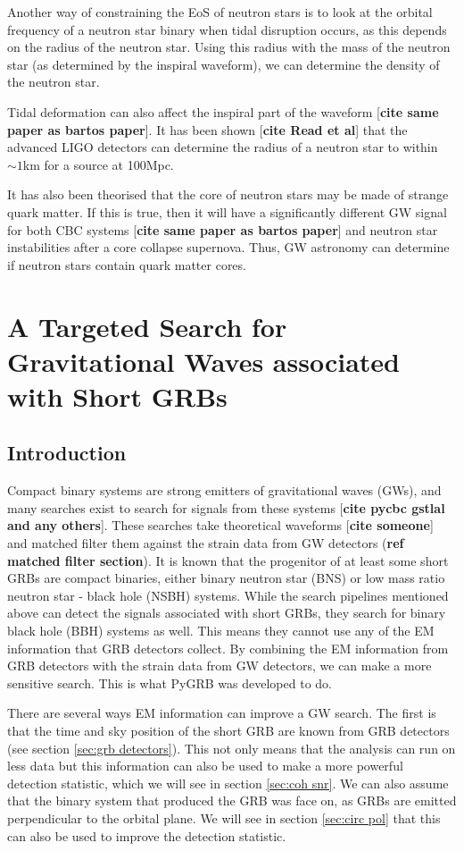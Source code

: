 \documentclass[11pt]{cuthesis}
\begin{document}
Another way of constraining the EoS of neutron stars is to look at the orbital frequency of a neutron star binary when tidal disruption occurs, as this depends on the radius of the neutron star. Using this radius with the mass of the neutron star (as determined by the inspiral waveform), we can determine the density of the neutron star. 

Tidal deformation can also affect the inspiral part of the waveform [\textbf{cite same paper as bartos paper}]. It has been shown [\textbf{cite Read et al}] that the advanced LIGO detectors can determine the radius of a neutron star to within $\sim 1$km for a source at 100Mpc. 

It has also been theorised that the core of neutron stars may be made of strange quark matter. If this is true, then it will have a significantly different GW signal for both CBC systems [\textbf{cite same paper as bartos paper}] and neutron star instabilities after a core collapse supernova. Thus, GW astronomy can determine if neutron stars contain quark matter cores. 


\chapter{A Targeted Search for Gravitational Waves associated with Short GRBs} \label{chap: CBC}
\section{Introduction}\label{CBCintro}
Compact binary systems are strong emitters of gravitational waves (GWs), and many searches exist to search for signals from these systems [\textbf{cite pycbc gstlal and any others}]. These searches take theoretical waveforms [\textbf{cite someone}] and matched filter them against the strain data from GW detectors (\textbf{ref matched filter section}). It is known that the progenitor of at least some short GRBs are compact binaries, either binary neutron star (BNS) or low mass ratio neutron star - black hole (NSBH) systems. While the search pipelines mentioned above can detect the signals associated with short GRBs, they search for binary black hole (BBH) systems as well. This means they cannot use any of the EM information that GRB detectors collect. By combining the EM information from GRB detectors with the strain data from GW detectors, we can make a more sensitive search. This is what PyGRB was developed to do.

There are several ways EM information can improve a GW search. The first is that the time and sky position of the short GRB are known from GRB detectors (see section \ref{sec:grb detectors}). This not only means that the analysis can run on less data but this information can also be used to make a more powerful detection statistic, which we will see in section \ref{sec:coh snr}. We can also assume that the binary system that produced the GRB was face on, as GRBs are emitted perpendicular to the orbital plane. We will see in section \ref{sec:circ pol} that this can also be used to improve the detection statistic.  
\end{document}
